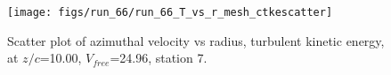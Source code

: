 \begin{figure}[H]
\centering
\texttt{[image: figs/run\_66/run\_66\_T\_vs\_r\_mesh\_ctkescatter]}
\caption{Scatter plot of azimuthal velocity vs radius, turbulent kinetic energy, at $z/c$=10.00, $V_{free}$=24.96, station 7.}
\end{figure}



